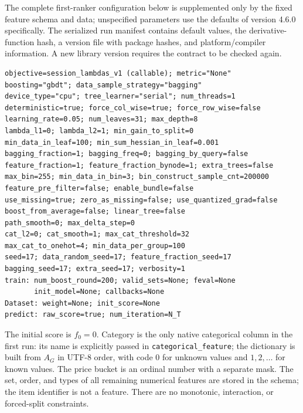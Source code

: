 \documentclass[12pt,a4paper]{article}
\newcommand{\code}[1]{{\ttfamily\small\nolinkurl{#1}}}
\theoremstyle{plainru}
\begin{document}
The complete first-ranker configuration below is supplemented only
by the fixed feature schema and data; unspecified parameters
use the defaults of version 4.6.0 specifically. The serialized run manifest
contains default values, the derivative-function hash, a version file
with package hashes, and platform/compiler information. A new
library version requires the contract to be checked again.
\begin{verbatim}
objective=session_lambdas_v1 (callable); metric="None"
boosting="gbdt"; data_sample_strategy="bagging"
device_type="cpu"; tree_learner="serial"; num_threads=1
deterministic=true; force_col_wise=true; force_row_wise=false
learning_rate=0.05; num_leaves=31; max_depth=8
lambda_l1=0; lambda_l2=1; min_gain_to_split=0
min_data_in_leaf=100; min_sum_hessian_in_leaf=0.001
bagging_fraction=1; bagging_freq=0; bagging_by_query=false
feature_fraction=1; feature_fraction_bynode=1; extra_trees=false
max_bin=255; min_data_in_bin=3; bin_construct_sample_cnt=200000
feature_pre_filter=false; enable_bundle=false
use_missing=true; zero_as_missing=false; use_quantized_grad=false
boost_from_average=false; linear_tree=false
path_smooth=0; max_delta_step=0
cat_l2=0; cat_smooth=1; max_cat_threshold=32
max_cat_to_onehot=4; min_data_per_group=100
seed=17; data_random_seed=17; feature_fraction_seed=17
bagging_seed=17; extra_seed=17; verbosity=1
train: num_boost_round=200; valid_sets=None; feval=None
       init_model=None; callbacks=None
Dataset: weight=None; init_score=None
predict: raw_score=true; num_iteration=N_T
\end{verbatim}
The initial score is $f_0=0$. Category is the only native
categorical column in the first run: its name is explicitly passed
in \code{categorical\_feature}; the dictionary is built from $A_G$ in
UTF-8 order, with code $0$ for unknown values and $1,2,\ldots$ for known values.
The price bucket is an ordinal number with a separate mask.
The set, order, and types of all remaining numerical features are stored
in the schema; the item identifier is not a feature.
There are no monotonic, interaction, or forced-split constraints.
\end{document}
